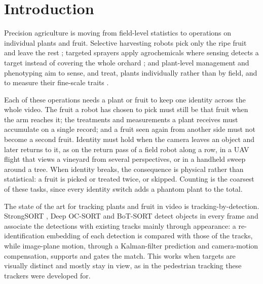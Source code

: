 \documentclass[pdflatex,sn-basic]{sn-jnl}%
\theoremstyle{thmstyleone}%
\begin{document}
\maketitle

\section{Introduction}\label{sec:intro}

Precision agriculture is moving from field-level statistics to operations on individual plants and fruit.
Selective harvesting robots pick only the ripe fruit and leave the rest \citep{rajendran2024selective};
targeted sprayers apply agrochemicals where sensing detects a target instead of covering the whole orchard \citep{mahmud2021precision,wu2025orchard};
and plant-level management and phenotyping aim to sense, and treat, plants individually rather than by field, and to measure their fine-scale traits \citep{sarkar2024cyber,xu2022phenotyping}.

Each of these operations needs a plant or fruit to keep one identity across the whole video.
The fruit a robot has chosen to pick must still be that fruit when the arm reaches it; the treatments and measurements a plant receives must accumulate on a single record; and a fruit seen again from another side must not become a second fruit.
Identity must hold when the camera leaves an object and later returns to it, as on the return pass of a field robot along a row, in a UAV flight that views a vineyard from several perspectives, or in a handheld sweep around a tree.
When identity breaks, the consequence is physical rather than statistical: a fruit is picked or treated twice, or skipped.
Counting is the coarsest of these tasks, since every identity switch adds a phantom plant to the total.

The state of the art for tracking plants and fruit in video is tracking-by-detection.
StrongSORT \citep{du2023strongsort}, Deep OC-SORT \citep{maggiolino2023deepocsort} and BoT-SORT \citep{aharon2022botsort} detect objects in every frame and associate the detections with existing tracks mainly through appearance: a re-identification embedding of each detection is compared with those of the tracks, while image-plane motion, through a Kalman-filter prediction and camera-motion compensation, supports and gates the match.
This works when targets are visually distinct and mostly stay in view, as in the pedestrian tracking these trackers were developed for.
\end{document}
